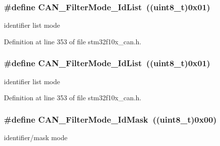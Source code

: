 \subsubsection[{\texorpdfstring{C\+A\+N\+\_\+\+Filter\+Mode\+\_\+\+Id\+List}{CAN_FilterMode_IdList}}]{\setlength{\rightskip}{0pt plus 5cm}\#define C\+A\+N\+\_\+\+Filter\+Mode\+\_\+\+Id\+List~(({\bf uint8\+\_\+t})0x01)}\hypertarget{group___c_a_n__filter__mode_ga91e9144f71b15ac345ee89314711c158}{}\label{group___c_a_n__filter__mode_ga91e9144f71b15ac345ee89314711c158}
identifier list mode 

Definition at line 353 of file stm32f10x\+\_\+can.\+h.

\subsubsection[{\texorpdfstring{C\+A\+N\+\_\+\+Filter\+Mode\+\_\+\+Id\+List}{CAN_FilterMode_IdList}}]{\setlength{\rightskip}{0pt plus 5cm}\#define C\+A\+N\+\_\+\+Filter\+Mode\+\_\+\+Id\+List~(({\bf uint8\+\_\+t})0x01)}\hypertarget{group___c_a_n__filter__mode_ga91e9144f71b15ac345ee89314711c158}{}\label{group___c_a_n__filter__mode_ga91e9144f71b15ac345ee89314711c158}
identifier list mode 

Definition at line 353 of file stm32f10x\+\_\+can.\+h.

\subsubsection[{\texorpdfstring{C\+A\+N\+\_\+\+Filter\+Mode\+\_\+\+Id\+Mask}{CAN_FilterMode_IdMask}}]{\setlength{\rightskip}{0pt plus 5cm}\#define C\+A\+N\+\_\+\+Filter\+Mode\+\_\+\+Id\+Mask~(({\bf uint8\+\_\+t})0x00)}\hypertarget{group___c_a_n__filter__mode_ga8136e518fb31fd91079e4c7c4c19c94b}{}\label{group___c_a_n__filter__mode_ga8136e518fb31fd91079e4c7c4c19c94b}
identifier/mask mode 

